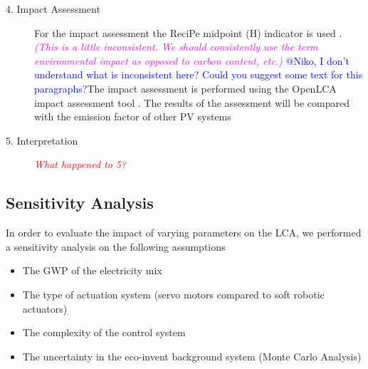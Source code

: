 \begin{description}
\item[4. Impact Assessment] For the impact assessment the ReciPe midpoint (H) indicator is used \cite{zelm2009recipe}. \textcolor{magenta}{\textit{(This is a little inconsistent. We should consistently use the term environmental impact as opposed to carbon content, etc.)}} \textcolor{blue}{@Niko, I don't understand what is inconsistent here? Could you suggest some text for this paragraphs?}The impact assessment is performed using the OpenLCA impact assessment tool \cite{ciroth2007ict}. The results of the assessment will be compared with the emission factor of other PV systems \cite{raugei2007life}\\


\item[5. Interpretation] \textcolor{red}{\textit{What happened to 5?}}

\end{description}

\subsection{Sensitivity Analysis}

In order to evaluate the impact of varying parameters on the LCA, we performed a sensitivity analysis on the following assumptions
\begin{itemize}
\item The GWP of the electricity mix
\item The type of actuation system (servo motors compared to soft robotic actuators)
\item The complexity of the control system
\item The uncertainty in the eco-invent background system (Monte Carlo Analysis)
\end{itemize}


